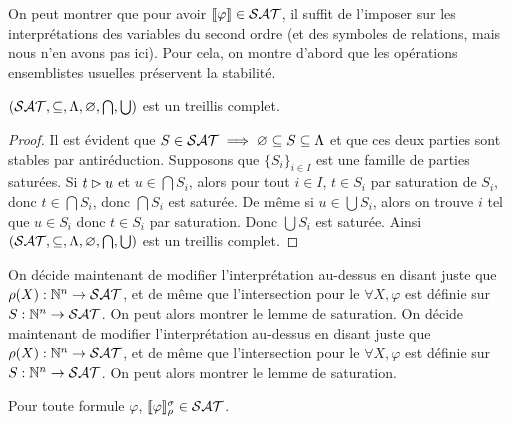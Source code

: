 \documentclass{article}
\begin{document}
On peut montrer que pour avoir $\llbracket \varphi \rrbracket \in \mathcal {SAT}$, il suffit de l'imposer sur les interprétations des variables du second ordre (et des symboles de relations, mais nous n'en avons pas ici). Pour cela, on montre d'abord que les opérations ensemblistes usuelles préservent la stabilité.

\begin{lem}
  $(\mathcal {SAT},\subseteq,\Lambda,\varnothing,\bigcap,\bigcup)$ est un treillis complet.
\end{lem}

\begin{proof}
  Il est évident que $S\in \mathcal {SAT} \implies \varnothing\subseteq S \subseteq \Lambda$ et que ces deux parties sont stables par antiréduction. Supposons que $\{S_i\}_{i\in I}$ est une famille de parties saturées. Si $t\rhd u$ et $u \in \bigcap S_i$, alors pour tout $i \in I$, $t \in S_i$ par saturation de $S_i$, donc $t\in \bigcap S_i$, donc $\bigcap S_i$ est saturée. De même si $u \in \bigcup S_i$, alors on trouve $i$ tel que $u \in S_i$ donc $t\in S_i$ par saturation. Donc $\bigcup S_i$ est saturée. Ainsi $(\mathcal {SAT},\subseteq,\Lambda,\varnothing, \bigcap,\bigcup)$ est un treillis complet.
\end{proof}

On décide maintenant de modifier l'interprétation au-dessus en disant juste que $\rho(X) : \mathbb{N}^n \to \mathcal {SAT}$, et de même que l'intersection pour le $\forall X, \varphi$ est définie sur $S : \mathbb{N}^n \to \mathcal {SAT}$. On peut alors montrer le lemme de saturation.
On décide maintenant de modifier l'interprétation au-dessus en disant juste que $\rho(X) : \mathbb{N}^n \to \mathcal {SAT}$, et de même que l'intersection pour le $\forall X, \varphi$ est définie sur $S : \mathbb{N}^n \to \mathcal {SAT}$. On peut alors montrer le lemme de saturation.
\begin{lem}[Saturation]
  Pour toute formule $\varphi$, $\llbracket \varphi \rrbracket_\rho^\sigma\in \mathcal {SAT}$.
\end{lem}
\end{document}
